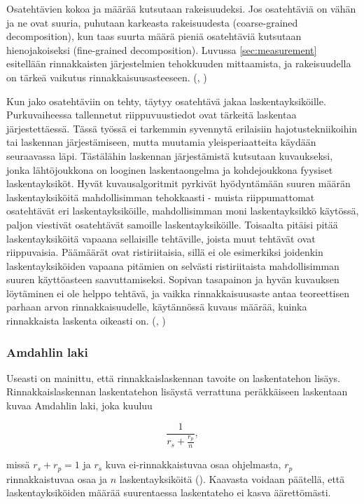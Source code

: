 Osatehtävien kokoa ja määrää kutsutaan rakeisuudeksi. Jos osatehtäviä on vähän
ja ne ovat suuria, puhutaan karkeasta rakeisuudesta (coarse-grained
decomposition), kun taas suurta määrä pieniä osatehtäviä kutsutaan
hienojakoiseksi (fine-grained decomposition). Luvussa \ref{sec:measurement}
esitellään rinnakkaisten järjestelmien tehokkuuden mittaamista, ja rakeisuudella
on tärkeä vaikutus rinnakkaisuusasteeseen. (\citealt{intro}, \citealt{rauber})

Kun jako osatehtäviin on tehty, täytyy osatehtävä jakaa laskentayksiköille.
Purkuvaiheessa tallennetut riippuvuustiedot ovat tärkeitä laskentaa
järjestettäessä. Tässä työssä ei tarkemmin syvennytä erilaisiin
hajotustekniikoihin tai laskennan järjestämiseen, mutta muutamia
yleisperiaatteita käydään seuraavassa läpi. Tästälähin laskennan järjestämistä
kutsutaan kuvaukseksi, jonka lähtöjoukkona on looginen laskentaongelma ja kohdejoukkona fyysiset laskentayksiköt.
Hyvät kuvausalgoritmit pyrkivät hyödyntämään suuren määrän laskentayksiköitä
mahdollisimman tehokkaasti - muista riippumattomat osatehtävät eri
laskentayksiköille, mahdollisimman moni laskentayksikkö käytössä,
paljon viestivät osatehtävät samoille laskentayksiköille.
Toisaalta pitäisi pitää laskentayksiköitä vapaana sellaisille tehtäville,
joista muut tehtävät ovat riippuvaisia. Päämäärät ovat ristiriitaisia, sillä
ei ole esimerkiksi joidenkin laskentayksiköiden vapaana pitämien on selvästi
ristiriitaista mahdollisimman suuren käyttöasteen saavuttamiseksi. Sopivan
tasapainon ja hyvän kuvauksen löytäminen ei ole helppo tehtävä, ja vaikka
rinnakkaisuusaste antaa teoreettisen parhaan arvon rinnakkaisuudelle,
käytännössä kuvaus määrää, kuinka rinnakkaista laskenta oikeasti on.
(\citealt{intro}, \citealt{rauber})

\subsubsection{Amdahlin laki}

Useasti on mainittu, että rinnakkaislaskennan tavoite on laskentatehon
lisäys. Rinnakkaislaskennan laskentatehon lisäystä verrattuna peräkkäiseen
laskentaan kuvaa Amdahlin laki, joka kuuluu

\begin{center}
\begin{equation}\frac{1}{r_s + \frac{r_p}{n}},\end{equation}
\end{center}

missä $r_s + r_p = 1$ ja $r_s$ kuva ei-rinnakkaistuvaa osaa ohjelmasta,
$r_p$ rinnakkaistuvaa osaa ja $n$ laskentayksiköitä (\citealt{amdahl}).
Kaavasta voidaan päätellä, että laskentayksiköiden määrää suurentaessa
laskentateho ei kasva äärettömästi.

